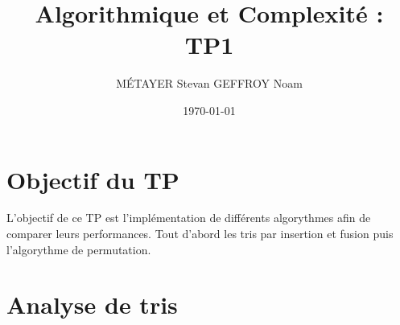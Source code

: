 \documentclass[12pt]{article}
\title{Algorithmique et Complexité : TP1}
\author{MÉTAYER Stevan \break GEFFROY Noam}
\date{\today}
\begin{document}


\newpage

\renewcommand*\contentsname{Sommaire}
\setcounter{tocdepth}{3}
\tableofcontents

\newpage
\section{Objectif du TP}

L'objectif de ce TP est l'implémentation de différents algorythmes afin de comparer leurs performances. Tout d'abord les tris par insertion et fusion puis l'algorythme de permutation.


\newpage

\section{Analyse de tris}
\end{document}
